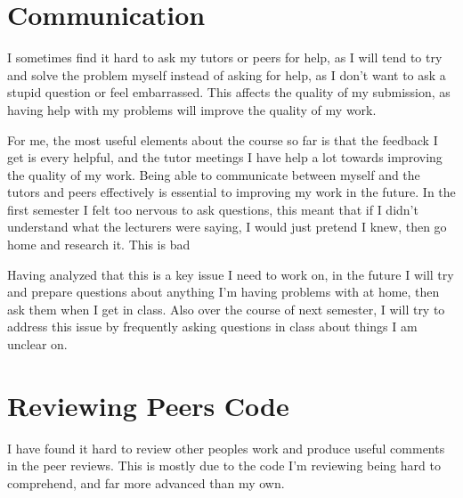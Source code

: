 \documentclass{scrartcl}
\begin{document}
\section{Communication}
I sometimes find it hard to ask my tutors or peers for help, as I will tend to try and solve the problem myself instead of asking for help, as I don't want to ask a stupid question or feel embarrassed. This affects the quality of my submission, as having help with my problems will improve the quality of my work.

For me, the most useful elements about the course so far is that the feedback I get is every helpful, and the tutor meetings I have help a lot towards improving the quality of my work. Being able to communicate between myself and the tutors and peers effectively is essential to improving my work in the future. In the first semester I felt too nervous to ask questions, this meant that if I didn't understand what the lecturers were saying, I would just pretend I knew, then go home and research it. This is bad 

Having analyzed that this is a key issue I need to work on, in the future I will try and prepare questions about anything I'm having problems with at home, then ask them when I get in class. Also over the course of next semester, I will try to address this issue by frequently asking questions in class about things I am unclear on. 

\section{Reviewing Peers Code}
I have found it hard to review other peoples work and produce useful comments in the peer reviews. This is mostly due to the code I'm reviewing being hard to comprehend, and far more advanced than my own.
\end{document}
